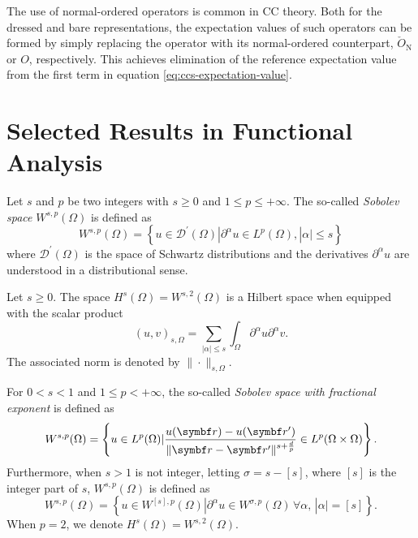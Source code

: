 The use of normal-ordered operators is common in \acrlong{CC} theory. Both for
the dressed and bare representations, the expectation values of such operators
can be formed by simply replacing the operator with its normal-ordered counterpart,
$\check{O}_\mathrm{N}$ or $O$, respectively.
This achieves elimination of the reference expectation value from the first
term in equation \eqref{eq:ccs-expectation-value}.

\section{Selected Results in Functional Analysis}

\begin{defin}
Let $s$ and $p$ be two integers with $s\geq 0$ and $1\leq p \leq +\infty$.
The so-called \emph{Sobolev space} $W^{s, p}(\Omega)$ is defined as
\begin{equation}
W^{s,p}(\Omega) =
\left\lbrace
u \in \mathcal{D}^\prime(\Omega) | \partial^\alpha u \in L^p(\Omega), |\alpha|\leq s
\right\rbrace
\end{equation}
where $\mathcal{D}^\prime(\Omega)$ is the space of Schwartz distributions and the
derivatives $\partial^\alpha u$ are understood in a distributional sense.
\end{defin}

\begin{lemma}
Let $s\geq 0$. The space $H^s(\Omega) = W^{s, 2}(\Omega)$ is a Hilbert space
when equipped with the scalar product
\begin{equation}
(u, v)_{s, \Omega} = \sum_{|\alpha|\leq s}\int_\Omega\partial^\alpha u \partial^\alpha v.
\end{equation}
The associated norm is denoted by $\| \cdot \|_{s, \Omega}$.
\end{lemma}

\begin{defin}
For $0 < s < 1$ and $1 \leq p < +\infty$, the so-called \emph{Sobolev space with fractional
exponent} is defined as
\begin{equation}
W^{s, p}(\Omega) =
\left\lbrace
u \in L^p(\Omega) |
\frac{u(\vect{r}) - u(\vect{r}^\prime)}{\| \vect{r} - \vect{r}^\prime\|^{s+\frac{d}{p}}}
\in L^p(\Omega \times \Omega)
\right\rbrace.
\end{equation}
Furthermore, when $s> 1$ is not integer, letting $\sigma = s - [s]$, where $[s]$ is the integer
part of $s$, $W^{s,p}(\Omega)$ is defined as
\begin{equation}
W^{s, p}(\Omega) =
\left\lbrace
u \in W^{[s], p}(\Omega) |
\partial^\alpha u \in W^{\sigma, p}(\Omega)\, \forall \alpha,\, |\alpha| = [s]
\right\rbrace.
\end{equation}
When $p=2$, we denote $H^s(\Omega) = W^{s,2}(\Omega)$.
\end{defin}

